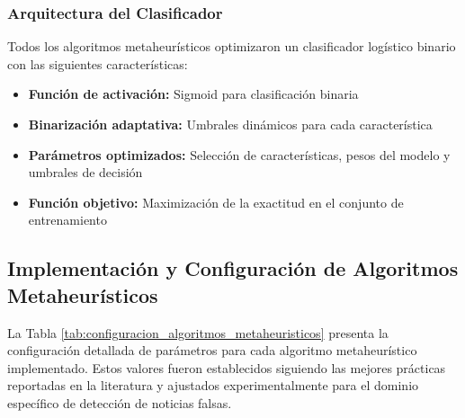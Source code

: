 \subsubsection{Arquitectura del Clasificador}

Todos los algoritmos metaheurísticos optimizaron un clasificador logístico binario con las siguientes características:

\begin{itemize}
    \item \textbf{Función de activación:} Sigmoid para clasificación binaria
    \item \textbf{Binarización adaptativa:} Umbrales dinámicos para cada característica
    \item \textbf{Parámetros optimizados:} Selección de características, pesos del modelo y umbrales de decisión
    \item \textbf{Función objetivo:} Maximización de la exactitud en el conjunto de entrenamiento
\end{itemize}

\subsection{Implementación y Configuración de Algoritmos Metaheurísticos}
\label{subsec:implementacion_algoritmos}

La Tabla \ref{tab:configuracion_algoritmos_metaheuristicos} presenta la configuración detallada de parámetros para cada algoritmo metaheurístico implementado. Estos valores fueron establecidos siguiendo las mejores prácticas reportadas en la literatura y ajustados experimentalmente para el dominio específico de detección de noticias falsas.

